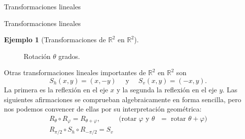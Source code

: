 \documentclass[a4paper,12pt,twoside,spanish,reqno]{amsbook}
\numberwithin{equation}{section}
\theoremstyle{definition}
\newtheorem{ejemplo}[teorema]{Ejemplo}
\theoremstyle{remark}
\newcommand{\R}{\mathbb R}
\begin{document}
\begin{chapter}{Transformaciones lineales}
\begin{section}{Transformaciones lineales}
\begin{ejemplo}[{\sc Transformaciones de $\R^2$ en $\R^2$}]
                
                    \begin{figure}[h]	
                    \caption{Rotación  $\theta$ grados. }
                    \label{rotacion-theta}
                \end{figure}
                
                
                
                Otras transformaciones lineales importantes de $\R^2$ en $\R^2$ son 
                $$
                S_h(x,y) = (x,-y) \quad \text{ y } \quad S_v(x,y) = (-x,y).
                $$
                La primera es la reflexión en el eje $x$ y la segunda la reflexión en el eje $y$. Las siguientes afirmaciones se comprueban algebraicamente en forma sencilla, pero nos podemos convencer de ellas por su interpretación geométrica:
                \begin{equation*}
                \begin{array}{ll}
                R_\theta \circ R_\varphi = R_{\theta +\varphi}, \quad &\text{(rotar $\varphi$ y $\theta$ $=$  rotar $\theta+\varphi$)} \\
                R_{\pi/2} \circ S_h \circ R_{-\pi/2} = S_v&
                \end{array}
                \end{equation*}
                
            \end{ejemplo}
    

\end{section}
\end{chapter}
\end{document}
